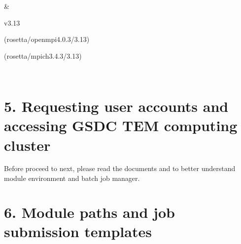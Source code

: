\documentclass[a4paper,10pt,english]{sphinxmanual}
\begin{document}
\begin{savenotes}
\begin{tabular}[t]{*{4}{}}
\begin{itemize}
\end{itemize}
&
\begin{DUlineblock}{0em}
\item[] v3.13
\item[] (rosetta/openmpi\sphinxhyphen{}4.0.3/3.13)
\item[] (rosetta/mpich\sphinxhyphen{}3.4.3/3.13)
\end{DUlineblock}
\\
\sphinxbottomrule
\end{tabular}
\sphinxtableafterendhook\par
\sphinxattableend\end{savenotes}


\section{5. Requesting user accounts and accessing GSDC TEM computing cluster}
\label{\detokenize{newfarm:requesting-user-accounts-and-accessing-gsdc-tem-computing-cluster}}
\sphinxAtStartPar
{\hyperref[\detokenize{guide:requesting-accounts}]{}}

\sphinxAtStartPar
Before proceed to next, please read the documents {\hyperref[\detokenize{guide:module-details}]{}} and {\hyperref[\detokenize{guide:batch-details}]{}} to better understand module environment and batch job manager.


\section{6. Module paths and job submission templates}
\label{\detokenize{newfarm:module-paths-and-job-submission-templates}}
\end{document}

